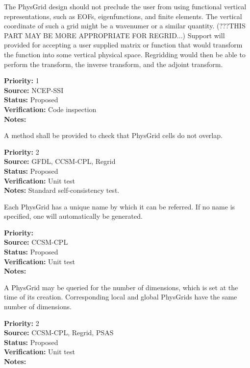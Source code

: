 The PhysGrid design should not preclude the user from using 
functional vertical representations, such as EOFs, eigenfunctions,
and finite elements.  The vertical coordinate of such a grid might be a wavenumer
or a similar quantity.
(???THIS PART MAY BE MORE APPROPRIATE FOR REGRID...) Support will provided for
accepting a user supplied matrix or function that would transform the function into some
vertical physical space. Regridding would then be able to perform the transform, the
inverse transform, and the adjoint transform.
\begin{reqlist}
{\bf Priority:} 1 \\
{\bf Source:} NCEP-SSI \\
{\bf Status:} Proposed \\
{\bf Verification:} Code inspection \\
{\bf Notes:} 
\end{reqlist}

A method shall be provided to check that PhysGrid cells do not overlap. 
\begin{reqlist}
{\bf Priority:} 2 \\
{\bf Source:} GFDL, CCSM-CPL, Regrid \\
{\bf Status:} Proposed \\
{\bf Verification:} Unit test\\
{\bf Notes:} Standard self-consistency test.
\end{reqlist}


Each PhysGrid has a unique name by which it can be referred.  If no name is
specified, one will automatically be generated.
\begin{reqlist}
{\bf Priority:} \\
{\bf Source:} CCSM-CPL \\
{\bf Status:} Proposed \\
{\bf Verification:} Unit test \\
{\bf Notes:} 
\end{reqlist}

A PhysGrid may be queried for the number of dimensions, which is
set at the time of its creation.  Corresponding local and global PhysGrids have
the same number of dimensions.
\begin{reqlist}
{\bf Priority:} 2 \\
{\bf Source:} CCSM-CPL, Regrid, 
PSAS  \\
{\bf Status:} Proposed \\
{\bf Verification:} Unit test \\
{\bf Notes:} 
\end{reqlist}

